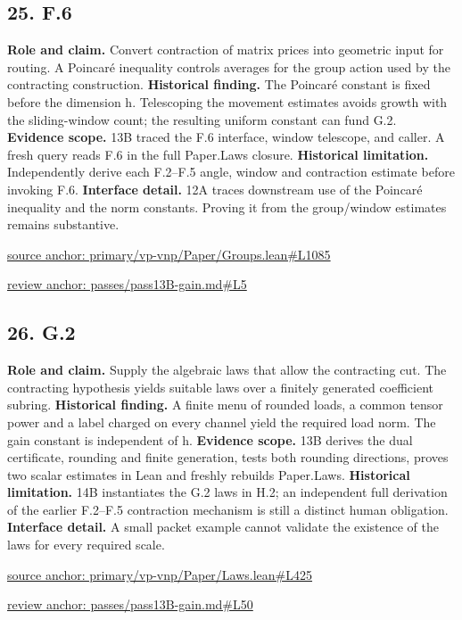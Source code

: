 \documentclass[11pt,letterpaper]{article}
\theoremstyle{definition}\newtheorem{definition}[theorem]{Definition}\newtheorem{example}[theorem]{Example}
\theoremstyle{remark}\newtheorem{remark}[theorem]{Remark}
\begin{document}
\subsection*{25. F.6}
\textbf{Role and claim.} Convert contraction of matrix prices into geometric input for routing. A Poincaré inequality controls averages for the group action used by the contracting construction.
\textbf{Historical finding.} The Poincaré constant is fixed before the dimension h. Telescoping the movement estimates avoids growth with the sliding-window count; the resulting uniform constant can fund G.2.
\textbf{Evidence scope.} 13B traced the F.6 interface, window telescope, and caller. A fresh query reads F.6 in the full Paper.Laws closure.
\textbf{Historical limitation.} Independently derive each F.2–F.5 angle, window and contraction estimate before invoking F.6.
\textbf{Interface detail.} 12A traces downstream use of the Poincaré inequality and the norm constants. Proving it from the group/window estimates remains substantive.
\par\href{https://github.com/nousentllc/VP-VNP-Review/blob/8a7976933b6b2b4ffda1ad3a0dfb5fc6b6f023e8/primary/vp-vnp/Paper/Groups.lean\#L1085}{source anchor: primary/vp-vnp/Paper/Groups.lean\#L1085}
\par\href{https://github.com/nousentllc/VP-VNP-Review/blob/8a7976933b6b2b4ffda1ad3a0dfb5fc6b6f023e8/passes/pass13B-gain.md\#L5}{review anchor: passes/pass13B-gain.md\#L5}
\goodbreak
{}
\hypertarget{claim.26}{}
\subsection*{26. G.2}
\textbf{Role and claim.} Supply the algebraic laws that allow the contracting cut. The contracting hypothesis yields suitable laws over a finitely generated coefficient subring.
\textbf{Historical finding.} A finite menu of rounded loads, a common tensor power and a label charged on every channel yield the required load norm. The gain constant is independent of h.
\textbf{Evidence scope.} 13B derives the dual certificate, rounding and finite generation, tests both rounding directions, proves two scalar estimates in Lean and freshly rebuilds Paper.Laws.
\textbf{Historical limitation.} 14B instantiates the G.2 laws in H.2; an independent full derivation of the earlier F.2–F.5 contraction mechanism is still a distinct human obligation.
\textbf{Interface detail.} A small packet example cannot validate the existence of the laws for every required scale.
\par\href{https://github.com/nousentllc/VP-VNP-Review/blob/8a7976933b6b2b4ffda1ad3a0dfb5fc6b6f023e8/primary/vp-vnp/Paper/Laws.lean\#L425}{source anchor: primary/vp-vnp/Paper/Laws.lean\#L425}
\par\href{https://github.com/nousentllc/VP-VNP-Review/blob/8a7976933b6b2b4ffda1ad3a0dfb5fc6b6f023e8/passes/pass13B-gain.md\#L50}{review anchor: passes/pass13B-gain.md\#L50}
\goodbreak
{}
\hypertarget{claim.27}{}
\end{document}
